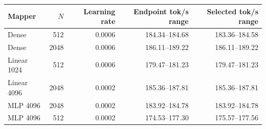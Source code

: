 \begin{tabular}{lrrrr}
\toprule
Mapper & $N$ & Learning rate & Endpoint tok/s range & Selected tok/s range \\
\midrule
Dense & 512 & 0.0006 & 184.34--184.68 & 183.36--184.58 \\
Dense & 2048 & 0.0006 & 186.11--189.22 & 186.11--189.22 \\
Linear 1024 & 512 & 0.0006 & 179.47--181.23 & 179.47--181.23 \\
Linear 4096 & 2048 & 0.0002 & 185.36--187.81 & 185.36--187.81 \\
MLP 4096 & 2048 & 0.0002 & 183.92--184.78 & 183.92--184.78 \\
MLP 4096 & 512 & 0.0002 & 174.53--177.30 & 175.57--177.56 \\
\bottomrule
\end{tabular}
